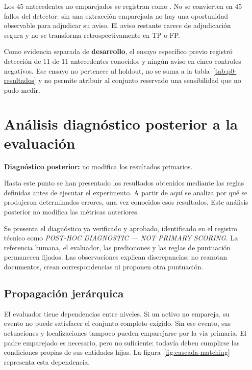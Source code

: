 Los 45 antecedentes no emparejados se registran como
. No se convierten en 45 fallos del
detector: sin una extracción emparejada no hay una oportunidad observable
para adjudicar su aviso. El aviso restante carece de adjudicación segura
y no se transforma retrospectivamente en TP o FP.

Como evidencia separada de \textbf{desarrollo}, el ensayo específico previo
registró detección de 11 de 11 antecedentes conocidos y ningún aviso en
cinco controles negativos. Ese ensayo no pertenece al holdout, no se suma
a la tabla~\ref{tab:p0-resultados} y no permite atribuir al conjunto reservado
una sensibilidad que no pudo medir.

\clearpage
\section{Análisis diagnóstico posterior a la evaluación}
\label{sec:diagnostico-posthoc}
\textbf{Diagnóstico posterior:} no modifica los resultados primarios.

Hasta este punto se han presentado los resultados obtenidos mediante las
reglas definidas antes de ejecutar el experimento. A partir de aquí se
analiza por qué se produjeron determinados errores, una vez conocidos esos
resultados. Este análisis posterior no modifica las métricas anteriores.

Se presenta el diagnóstico ya verificado y aprobado, identificado en el
registro técnico como \emph{POST-HOC DIAGNOSTIC — NOT PRIMARY SCORING}.
La referencia humana, el evaluador, las predicciones y las reglas de
puntuación permanecen fijados. Las observaciones explican discrepancias;
no reanotan documentos, crean correspondencias ni proponen otra puntuación.

\subsection{Propagación jerárquica}
\label{sec:cascada-diagnostica}
El evaluador tiene dependencias entre niveles. Si un activo no empareja,
su evento no puede satisfacer el conjunto completo exigido. Sin ese evento,
sus actuaciones y localizaciones tampoco pueden emparejarse por la vía
primaria. El padre emparejado es necesario, pero no suficiente: todavía
deben cumplirse las condiciones propias de sus entidades hijas.
La figura~\ref{fig:cascada-matching} representa esta dependencia.

